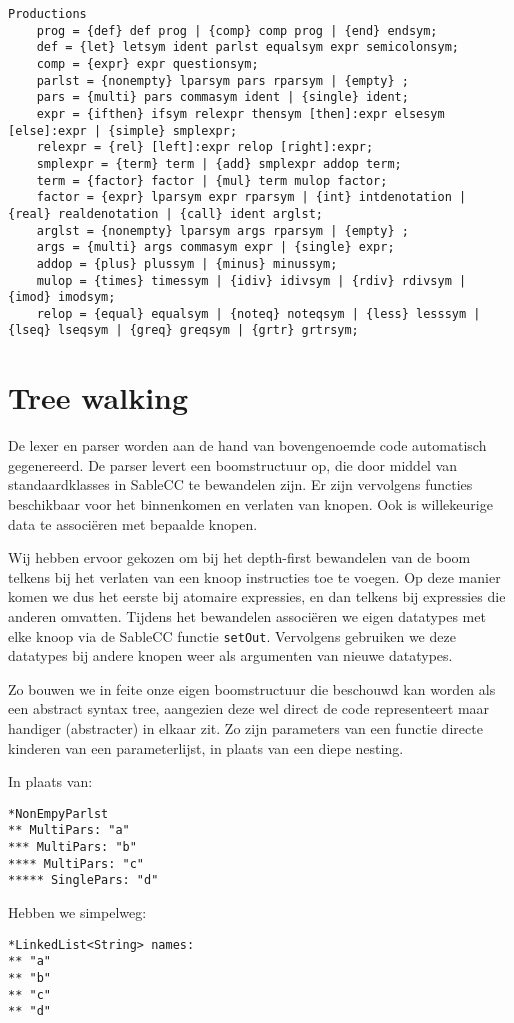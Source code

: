 \documentclass[11pt]{article}
\begin{document}
\begin{verbatim}
Productions
	prog = {def} def prog | {comp} comp prog | {end} endsym;
	def = {let} letsym ident parlst equalsym expr semicolonsym;
	comp = {expr} expr questionsym;
	parlst = {nonempty} lparsym pars rparsym | {empty} ;
	pars = {multi} pars commasym ident | {single} ident;
	expr = {ifthen} ifsym relexpr thensym [then]:expr elsesym [else]:expr | {simple} smplexpr;
	relexpr = {rel} [left]:expr relop [right]:expr;
	smplexpr = {term} term | {add} smplexpr addop term;
	term = {factor} factor | {mul} term mulop factor;
	factor = {expr} lparsym expr rparsym | {int} intdenotation | {real} realdenotation | {call} ident arglst;
	arglst = {nonempty} lparsym args rparsym | {empty} ;
	args = {multi} args commasym expr | {single} expr;
	addop = {plus} plussym | {minus} minussym;
	mulop = {times} timessym | {idiv} idivsym | {rdiv} rdivsym | {imod} imodsym;
	relop = {equal} equalsym | {noteq} noteqsym | {less} lesssym | {lseq} lseqsym | {greq} greqsym | {grtr} grtrsym;
\end{verbatim}

\section{Tree walking}

De lexer en parser worden aan de hand van bovengenoemde code automatisch gegenereerd. De parser levert een boomstructuur op, die door middel van standaardklasses in SableCC te bewandelen zijn. Er zijn vervolgens functies beschikbaar voor het binnenkomen en verlaten van knopen. Ook is willekeurige
data te associ\"eren met bepaalde knopen.

Wij hebben ervoor gekozen om bij het depth-first bewandelen van de boom telkens bij het verlaten van een knoop instructies toe te voegen. Op deze manier komen we dus het eerste bij atomaire expressies, en dan telkens bij expressies die anderen omvatten. Tijdens het bewandelen associ\"eren we eigen datatypes met elke knoop via de SableCC functie \verb+setOut+. Vervolgens gebruiken we deze datatypes bij andere knopen weer als argumenten van nieuwe datatypes.

Zo bouwen we in feite onze eigen boomstructuur die beschouwd kan worden als een abstract syntax tree, aangezien deze wel direct de code representeert maar handiger (abstracter) in elkaar zit. Zo zijn parameters van een functie directe kinderen van een parameterlijst, in plaats van een diepe nesting.

In plaats van:
\begin{verbatim}
*NonEmpyParlst
** MultiPars: "a"
*** MultiPars: "b"
**** MultiPars: "c"
***** SinglePars: "d"
\end{verbatim}
Hebben we simpelweg:
\begin{verbatim}
*LinkedList<String> names:
** "a"
** "b"
** "c"
** "d"
\end{verbatim}
\end{document}
